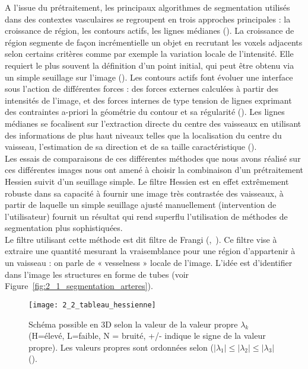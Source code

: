 A l’issue du prétraitement, les principaux algorithmes de segmentation utilisés dans des contextes vasculaires se regroupent en trois approches principales : la croissance de région, les contours actifs, les lignes médianes (\cite{Lesage2009}). La croissance de région segmente de façon incrémentielle un objet en recrutant les voxels adjacents selon certains critères comme par exemple la variation locale de l’intensité. Elle requiert le plus souvent la définition d’un point initial, qui peut être obtenu via un simple seuillage sur l’image (\cite{Boskamp2004}). Les contours actifs font évoluer une interface sous l’action de différentes forces : des forces externes calculées à partir des intensités de l’image, et des forces internes de type tension de lignes exprimant des contraintes a-priori la géométrie du contour et sa régularité (\cite{McInerney1996}). Les lignes médianes se focalisent sur l’extraction directe du centre des vaisseaux en utilisant des informations de plus haut niveaux telles que la localisation du centre du vaisseau, l’estimation de sa direction et de sa taille caractéristique (\cite{Aylward2002}).\\
Les essais de comparaisons de ces différentes méthodes que nous avons réalisé sur ces différentes images nous ont amené à choisir la combinaison d’un prétraitement Hessien suivit d’un seuillage simple. Le filtre Hessien est en effet extrêmement robuste dans sa capacité à fournir une image très contrastée des vaisseaux, à partir de laquelle un simple seuillage ajusté manuellement (intervention de l’utilisateur) fournit un résultat qui rend superflu l’utilisation de méthodes de segmentation plus sophistiquées. \\
Le filtre utilisant cette méthode est dit filtre de Frangi  (\cite{Frangi1998},~\cite{Manniesing2006}). Ce filtre vise à extraire une quantité mesurant la vraisemblance pour une région d’appartenir à un vaisseau : on parle de  « vesselness » locale de l’image. L’idée est d’identifier dans l’image les structures en forme de tubes (voir Figure~\ref{fig:2_1_segmentation_arteres}).\\
\begin{figure}[!t]
\centering
\texttt{[image: 2\_2\_tableau\_hessienne]}
\caption{Schéma possible en 3D selon la valeur de la valeur propre $\lambda_k$ (H=élevé, L=faible, N = bruité, +/- indique le signe de la valeur propre). Les valeurs propres sont ordonnées selon ($|\lambda_1|\leqslant |\lambda_2|\leqslant |\lambda_3|$ (\cite{Frangi1998}).}
\label{fig:2_2_tableau_hessienne}	
\end{figure}
